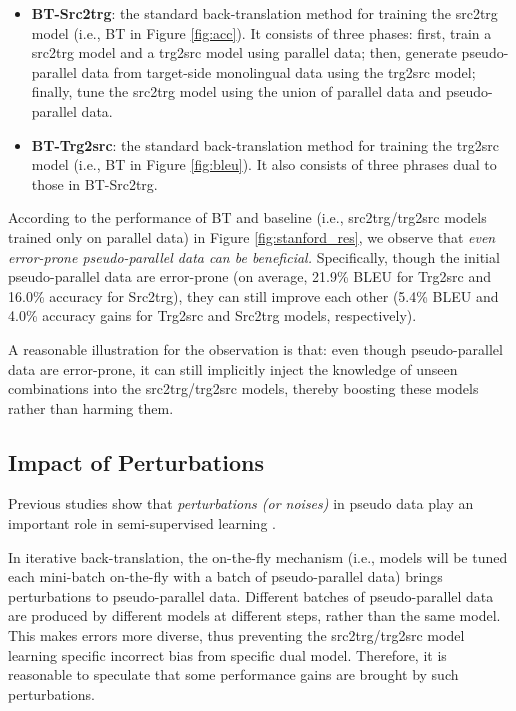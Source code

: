 \documentclass[letterpaper]{article} %
\begin{document}
\begin{itemize}
\item \textbf{BT-Src2trg}: the standard back-translation method for training the src2trg model (i.e., BT in Figure \ref{fig:acc}).
It consists of three phases:
first, train a src2trg model and a trg2src model using parallel data;
then, generate pseudo-parallel data from target-side monolingual data using the trg2src model;
finally, tune the src2trg model using the union of parallel data and pseudo-parallel data.
\item \textbf{BT-Trg2src}: the standard back-translation method for training the trg2src model (i.e., BT in Figure \ref{fig:bleu}).
It also consists of three phrases dual to those in BT-Src2trg.
\end{itemize}







According to the performance of BT and baseline (i.e., src2trg/trg2src models trained only on parallel data) in Figure \ref{fig:stanford_res}, we observe that \emph{even error-prone pseudo-parallel data can be beneficial.}
Specifically, though the initial pseudo-parallel data are error-prone (on average, 21.9\% BLEU for Trg2src and 16.0\% accuracy for Src2trg), they can still improve each other (5.4\% BLEU and 4.0\% accuracy gains for Trg2src and Src2trg models, respectively).

A reasonable illustration for the observation is that: even though pseudo-parallel data are error-prone, it can still implicitly inject the knowledge of unseen combinations into the src2trg/trg2src models, thereby boosting these models rather than harming them.

\subsection{Impact of Perturbations}
\label{section:otf}


Previous studies show that \emph{perturbations (or noises)} in pseudo data play an important role in semi-supervised learning \cite{zhang2016exploiting,edunov2018understanding,he2019revisiting,xie2020self}.

In iterative back-translation, the on-the-fly mechanism (i.e., models will be tuned each mini-batch on-the-fly with a batch of pseudo-parallel data) brings perturbations to pseudo-parallel data.
Different batches of pseudo-parallel data are produced by different models at different steps, rather than the same model.
This makes errors more diverse, thus preventing the src2trg/trg2src model learning specific incorrect bias from specific dual model.
Therefore, it is reasonable to speculate that some performance gains are brought by such perturbations.
\end{document}
